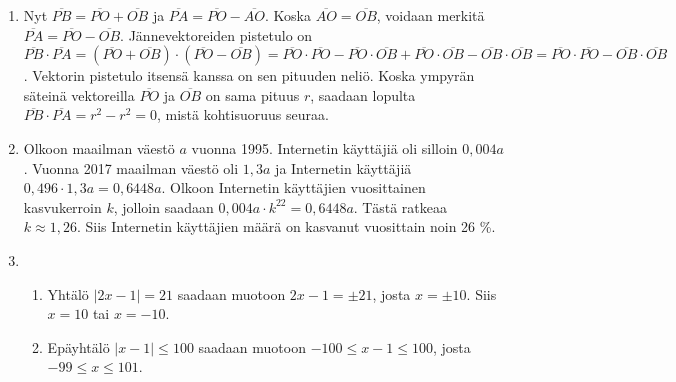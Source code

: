 \documentclass[12pt,fleqn]{article}
\begin{document}
\begin{enumerate}[label=\textbf{\arabic*.}]

\item Nyt \(\overline{PB}=\overline{PO}+\overline{OB}\) ja \(\overline{PA}=\overline{PO}-\overline{AO}\). Koska \(\overline{AO}=\overline{OB}\), voidaan merkitä \(\overline{PA}=\overline{PO}-\overline{OB}\). Jännevektoreiden pistetulo on \(\overline{PB}\cdot \overline{PA}=(\overline{PO}+\overline{OB})\cdot (\overline{PO}-\overline{OB})=\overline{PO}\cdot \overline{PO}-\overline{PO}\cdot \overline{OB}+\overline{PO}\cdot \overline{OB}-\overline{OB}\cdot \overline{OB}=\overline{PO}\cdot \overline{PO}-\overline{OB}\cdot \overline{OB}\). Vektorin pistetulo itsensä kanssa on sen pituuden neliö. Koska ympyrän säteinä vektoreilla \(\overline{PO}\) ja \(\overline{OB}\) on sama pituus \(r\), saadaan lopulta \(\overline{PB}\cdot \overline{PA}=r^2-r^2=0\), mistä kohtisuoruus seuraa.

\item Olkoon maailman väestö \(a\) vuonna 1995. Internetin käyttäjiä oli silloin \(0,004a\). Vuonna 2017 maailman väestö oli \(1,3a\) ja Internetin käyttäjiä \(0,496\cdot 1,3a=0,6448a\). Olkoon Internetin käyttäjien vuosittainen kasvukerroin \(k\), jolloin saadaan \(0,004a\cdot k^{22}=0,6448a\). Tästä ratkeaa \(k\approx 1,26\). Siis Internetin käyttäjien määrä on kasvanut vuosittain noin 26 \%.

\item 
\begin{enumerate}[label=\textbf{\alph*)}]
\item Yhtälö \(|2x-1|=21\) saadaan muotoon \(2x-1=\pm 21\), josta \(x=\pm 10\). Siis \(x=10\) tai \(x=-10\).

\item Epäyhtälö \(|x-1|\leq 100\) saadaan muotoon \(-100\leq x-1 \leq 100\), josta \(-99\leq x \leq 101\).


\end{enumerate}
\end{enumerate}
\end{document}
